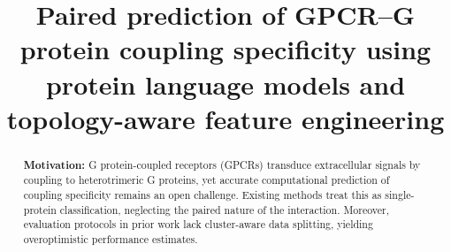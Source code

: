 \documentclass[11pt,a4paper]{article}
\title{\LARGE\bfseries Paired prediction of GPCR--G protein coupling specificity using protein language models and topology-aware feature engineering}
\author{}
\date{}
\begin{document}
\linenumbers

\pagestyle{plain}

\maketitle

\begin{abstract}

\textbf{Motivation:} G protein-coupled receptors (GPCRs) transduce extracellular signals by coupling to heterotrimeric G proteins, yet accurate computational prediction of coupling specificity remains an open challenge. Existing methods treat this as single-protein classification, neglecting the paired nature of the interaction. Moreover, evaluation protocols in prior work lack cluster-aware data splitting, yielding overoptimistic performance estimates.


\end{abstract}
\end{document}
